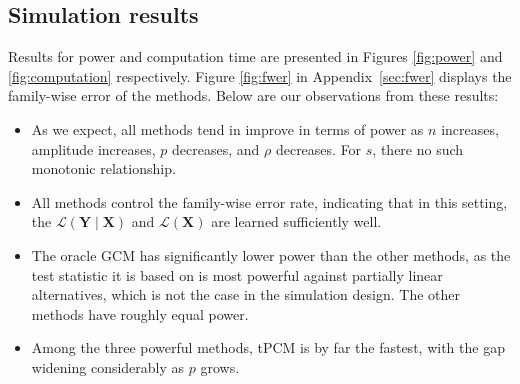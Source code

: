 \documentclass[12pt]{article}
\theoremstyle{definition}
\theoremstyle{remark}
\newcommand{\prx}{\bm X}								%
\newcommand{\pry}{{\bm Y}}								%
\newcommand{\law}{\mathcal L}							%
\begin{document}
	\subsection{Simulation results}

	Results for power and computation time are presented in Figures \ref{fig:power} and \ref{fig:computation} respectively. Figure \ref{fig:fwer} in Appendix~\ref{sec:fwer} displays the family-wise error of the methods. Below are our observations from these results:

	\begin{itemize}
		\item As we expect, all methods tend in improve in terms of power as $n$ increases, amplitude increases, $p$ decreases, and $\rho$ decreases. For $s$, there no such monotonic relationship.
		\item All methods control the family-wise error rate, indicating that in this setting, the $\law(\pry\mid \prx)$ and $\law(\prx)$ are learned sufficiently well.
		\item The oracle GCM has significantly lower power than the other methods, as the test statistic it is based on is most powerful against partially linear alternatives, which is not the case in the simulation design. The other methods have roughly equal power.
		\item Among the three powerful methods, tPCM is by far the fastest, with the gap widening considerably as $p$ grows. 
 	\end{itemize}
\end{document}
